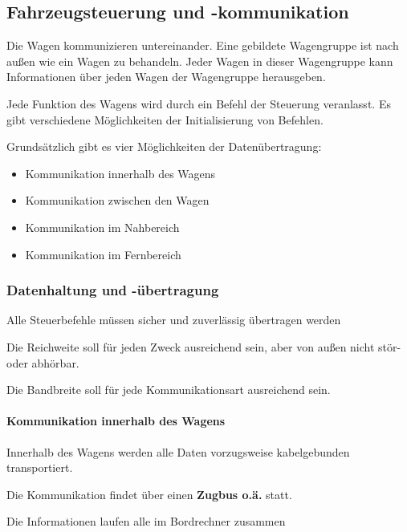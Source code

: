 \subsection{Fahrzeugsteuerung und -kommunikation}
Die Wagen kommunizieren untereinander. Eine gebildete Wagengruppe ist nach außen wie ein Wagen zu behandeln. Jeder Wagen in dieser Wagengruppe kann Informationen über jeden Wagen der Wagengruppe herausgeben.\par
Jede Funktion des Wagens wird durch ein Befehl der Steuerung veranlasst. Es gibt verschiedene Möglichkeiten der Initialisierung von Befehlen.\par
Grundsätzlich gibt es vier Möglichkeiten der Datenübertragung:
\begin{itemize}
    \item Kommunikation innerhalb des Wagens
    \item Kommunikation zwischen den Wagen
    \item Kommunikation im Nahbereich
    \item Kommunikation im Fernbereich
\end{itemize}

\subsubsection{Datenhaltung und -übertragung}
\begin{feat}
Alle Steuerbefehle müssen sicher und zuverlässig übertragen werden
\end{feat}
\begin{feat}
Die Reichweite soll für jeden Zweck ausreichend sein, aber von außen nicht stör- oder abhörbar.
\end{feat}
\begin{feat}
Die Bandbreite soll für jede Kommunikationsart ausreichend sein.
\end{feat}

\paragraph{Kommunikation innerhalb des Wagens}
\begin{feat}
Innerhalb des Wagens werden alle Daten vorzugsweise kabelgebunden transportiert. 
\end{feat}
\begin{feat}
Die Kommunikation findet über einen \textbf{Zugbus o.ä.} statt.
\end{feat}
\begin{feat}
Die Informationen laufen alle im Bordrechner zusammen
\end{feat}

